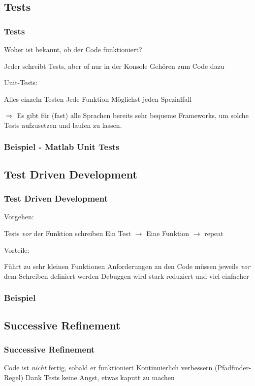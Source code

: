 \documentclass[handout]{beamer}
\begin{document}
\subsection{Tests}
\begin{frame}
    \frametitle{Tests}
    Woher ist bekannt, ob der Code funktioniert?\pause

    \begin{outline}
        \1 Jeder schreibt Tests, aber of nur in der Konsole
        \1 Gehören zum Code dazu
    \end{outline} \pause

    Unit-Tests:
    \begin{outline}
        \1 Alles einzeln Testen
            \2 Jede Funktion
            \2 Möglichst jeden Spezialfall
    \end{outline}
    $\Rightarrow$ Es gibt für (fast) alle Sprachen bereits sehr bequeme
    Frameworks, um solche Tests aufzusetzen und laufen zu lassen.
\end{frame}
\begin{frame}
    \frametitle{Beispiel - Matlab Unit Tests}
\end{frame}
\subsection{Test Driven Development}
\begin{frame}
    \frametitle{Test Driven Development}
    Vorgehen:

    \begin{outline}
        \1 Tests \emph{vor} der Funktion schreiben
        \1 Ein Test $\rightarrow$ Eine Funktion $\rightarrow$ repeat
    \end{outline}\pause

    Vorteile:

    \begin{outline}
        \1 Führt zu sehr kleinen Funktionen
        \1 Anforderungen an den Code müssen jeweils \emph{vor} dem Schreiben
        definiert werden
        \1 Debuggen wird stark reduziert und viel einfacher
    \end{outline}
\end{frame}
\begin{frame}
    \frametitle{Beispiel}
\end{frame}

\subsection{Successive Refinement}
\begin{frame}
    \frametitle{Successive Refinement}
    \begin{outline}
        \1 Code ist \emph{nicht} fertig, sobald er funktioniert
        \1 Kontinuierlich verbessern (Pfadfinder-Regel)
        \1 Dank Tests keine Angst, etwas kaputt zu machen
    \end{outline}
\end{frame}
\end{document}
